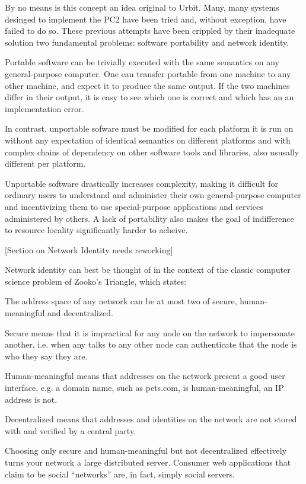 By no means is this concept an idea original to Urbit. Many, many systems
desinged to implement the PC2 have been tried and, without exception, have
failed to do so. These previous attempts have been crippled by their inadequate
solution two fundamental problems: software portability and network identity.

Portable software can be trivially executed with the same semantics on any
general-purpose computer. One can transfer portable from one machine to any
other machine, and expect it to produce the same output. If the two machines
differ in their output, it is easy to see which one is correct and which has an 
an implementation error.

In contrast, unportable sofware must be modified for each platform
it is run on without any expectation of identical semantics on different
platforms and with complex chains of dependency on other software tools and
libraries, also ususally different per platform.

Unportable software drastically increases complexity, making it difficult for
ordinary users to understand and administer their own general-purpose computer
and incentivizing them to use special-purpose applications and services
administered by others. A lack of portability also makes the goal of
indifference to resource locality significantly harder to acheive. 

[Section on Network Identity needs reworking]

Network identity can best be thought of in the context of the classic computer
science problem of Zooko's Triangle, which states:

The address space of any network can be at most two of secure, human-meaningful
and decentralized.

Secure means that it is impractical for any node on the network to impersonate
another, i.e. when any talks to any other node can authenticate that the node
is who they say they are.

Human-meaningful means that addresses on the network present a good user
interface, e.g. a domain name, such as pets.com, is human-meaningful, an IP
address is not.

Decentralized means that addresses and identities on the network are not stored
with and verified by a central party.

Choosing only secure and human-meaningful but not decentralized effectively
turns your network a large distributed server. Consumer web applications that
claim to be social ``networks'' are, in fact, simply social servers.

